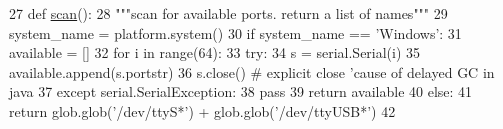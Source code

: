 \begin{DoxyCode}
27 \textcolor{keyword}{def }\hyperlink{namespacesoftware_1_1chipwhisperer_1_1common_1_1utils_1_1serialport_a88312598e7c21a4d1a702d8a39d12917}{scan}():
28     \textcolor{stringliteral}{"""scan for available ports. return a list of names"""}
29     system\_name = platform.system()
30     \textcolor{keywordflow}{if} system\_name == \textcolor{stringliteral}{'Windows'}:
31       available = []
32       \textcolor{keywordflow}{for} i \textcolor{keywordflow}{in} range(64):
33           \textcolor{keywordflow}{try}:
34               s = serial.Serial(i)
35               available.append(s.portstr)
36               s.close()   \textcolor{comment}{# explicit close 'cause of delayed GC in java}
37           \textcolor{keywordflow}{except} serial.SerialException:
38               \textcolor{keywordflow}{pass}
39       \textcolor{keywordflow}{return} available
40     \textcolor{keywordflow}{else}:
41       \textcolor{keywordflow}{return} glob.glob(\textcolor{stringliteral}{'/dev/ttyS*'}) + glob.glob(\textcolor{stringliteral}{'/dev/ttyUSB*'})
42 
\end{DoxyCode}
